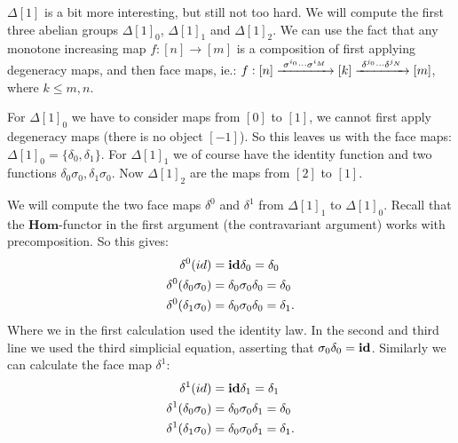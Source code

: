 \begin{example}
	$\Delta[1]$ is a bit more interesting, but still not too hard. We will compute the first three abelian groups $\Delta[1]_0$, $\Delta[1]_1$ and $\Delta[1]_2$. We can use the fact that any monotone increasing map $f: [n] \to [m]$ is a composition of first applying degeneracy maps, and then face maps, ie.: $f: [n] \xrightarrow{\,\,{\sigma^{i_0} \cdots \sigma^{i_M}}\,\,} [k] \xrightarrow{\,\,{\delta^{j_0} \cdots \delta^{j_N}}\,\,} [m]$, where $k \leq m, n$.

	For $\Delta[1]_0$ we have to consider maps from $[0]$ to $[1]$, we cannot first apply degeneracy maps (there is no object $[-1]$). So this leaves us with the face maps: $\Delta[1]_0 = \{\delta_0, \delta_1\}$. For $\Delta[1]_1$ we of course have the identity function and two functions $\delta_0\sigma_0, \delta_1\sigma_0$. Now $\Delta[1]_2$ are the maps from $[2]$ to $[1]$.

	We will compute the two face maps $\delta^0$ and $\delta^1$ from $\Delta[1]_1$ to $\Delta[1]_0$. Recall that the $\mathbf{Hom}$-functor in the first argument (the contravariant argument) works with precomposition. So this gives:
	\begin{align*}
		\delta^0(id) &= \mathbf{id} \delta_0 = \delta_0 \\
		\delta^0(\delta_0\sigma_0) &= \delta_0 \sigma_0 \delta_0 = \delta_0 \\
		\delta^0(\delta_1\sigma_0) &= \delta_0 \sigma_0 \delta_0 = \delta_1.
	\end{align*}
	Where we in the first calculation used the identity law. In the second and third line we used the third simplicial equation, asserting that $\sigma_0 \delta_0 = \mathbf{id}$. Similarly we can calculate the face map $\delta^1$:
	\begin{align*}
		\delta^1(id) &= \mathbf{id} \delta_1 = \delta_1 \\
		\delta^1(\delta_0\sigma_0) &= \delta_0 \sigma_0 \delta_1 = \delta_0 \\
		\delta^1(\delta_1\sigma_0) &= \delta_0 \sigma_0 \delta_1 = \delta_1.
	\end{align*}
\end{example}

